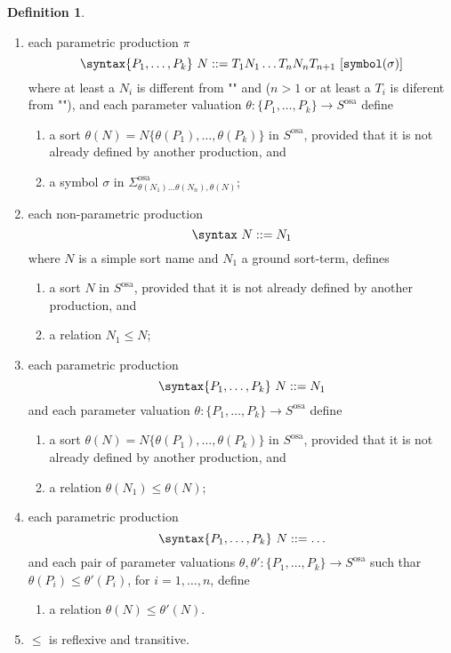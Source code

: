 \documentclass{article}
\theoremstyle{definition}
\theoremstyle{definition}
\theoremstyle{definition}
\newtheorem{definition}{Definition}[section]
\theoremstyle{definition}
\newtheorem{remark}{Remark}[section]
\theoremstyle{definition}
\theoremstyle{theorem}
\theoremstyle{theorem}
\theoremstyle{theorem}
\theoremstyle{theorem}
\theoremstyle{theorem}
\newcommand{\KWsymbol}{\texttt{symbol}}
\begin{document}
{\begin{definition}
\begin{enumerate}
\begin{remark}
\end{remark}
\item each parametric production $\pi$
\[\syntax\{P_1,\ldots,P_k\}\ N ::= T_1 N_1 \ldots T_n N_n T_{n+1}\ [\KWsymbol(\sigma)]\]
where at least a $N_i$ is different from "" and ($n>1$ or at least a $T_i$ is diferent from ""), and each parameter valuation
$\theta : \{P_1,\ldots,P_k\}\to S^\textrm{osa}$ define
\begin{enumerate}
\item a sort $\theta(N)=N\{\theta(P_1),\ldots,\theta(P_k)\}$ in $S^\textrm{osa}$, provided that it is not already defined by another production, and
\item a symbol $\sigma$ in $\Sigma^\textrm{osa}_{\theta(N_1)\ldots\theta(N_n),\theta(N)}$;
\end{enumerate}
\item each non-parametric production
\[\syntax\ N ::= N_1\]
where $N$ is a simple sort name and $N_1$ a ground sort-term, defines
\begin{enumerate}
\item a sort $N$ in $S^\textrm{osa}$, provided that it is not already defined by another production, and
\item a relation $N_1\le N$;
\end{enumerate}
\item each parametric production
\[\syntax\{P_1,\ldots,P_k\}\ N ::= N_1\]
and each parameter valuation $\theta : \{P_1,\ldots,P_k\}\to S^\textrm{osa}$ define
\begin{enumerate}
\item a sort $\theta(N)=N\{\theta(P_1),\ldots,\theta(P_k)\}$ in $S^\textrm{osa}$, provided that it is not already defined by another production, and
\item a relation $\theta(N_1)\le \theta(N)$;
\end{enumerate}
 \item each parametric production
\[\syntax\{P_1,\ldots,P_k\}\ N ::= \ldots\]
and each pair of parameter valuations $\theta,\theta' : \{P_1,\ldots,P_k\}\to S^\textrm{osa}$ such thar $\theta(P_i)\le \theta'(P_i)$, for $i=1,\ldots,n$, define
\begin{enumerate}
\item a relation $\theta(N)\le \theta'(N)$.
\end{enumerate}
\item $\le$ is reflexive and transitive.
\end{enumerate}
\end{definition}

}
\end{document}
